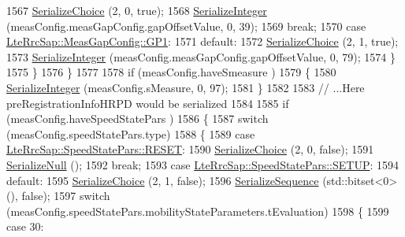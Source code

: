 \begin{DoxyCode}
1567               \hyperlink{classns3_1_1Asn1Header_a400ef4a710499da80fc55e23a973d4fa}{SerializeChoice} (2, 0, \textcolor{keyword}{true});
1568               \hyperlink{classns3_1_1Asn1Header_ab1c3bd37730affa7473bc759d625c29a}{SerializeInteger} (measConfig.measGapConfig.gapOffsetValue, 0, 39);
1569               \textcolor{keywordflow}{break};
1570             \textcolor{keywordflow}{case} \hyperlink{structns3_1_1LteRrcSap_1_1MeasGapConfig_a6e7b5e6cff6ff55fc54c397416804218aa24e9711cfb0bd2bcffca1630d6fe8b2}{LteRrcSap::MeasGapConfig::GP1}:
1571             \textcolor{keywordflow}{default}:
1572               \hyperlink{classns3_1_1Asn1Header_a400ef4a710499da80fc55e23a973d4fa}{SerializeChoice} (2, 1, \textcolor{keyword}{true});
1573               \hyperlink{classns3_1_1Asn1Header_ab1c3bd37730affa7473bc759d625c29a}{SerializeInteger} (measConfig.measGapConfig.gapOffsetValue, 0, 79);
1574             \}
1575         \}
1576     \}
1577 
1578   \textcolor{keywordflow}{if} (measConfig.haveSmeasure )
1579     \{
1580       \hyperlink{classns3_1_1Asn1Header_ab1c3bd37730affa7473bc759d625c29a}{SerializeInteger} (measConfig.sMeasure, 0, 97);
1581     \}
1582 
1583   \textcolor{comment}{// ...Here preRegistrationInfoHRPD would be serialized}
1584 
1585   \textcolor{keywordflow}{if} (measConfig.haveSpeedStatePars )
1586     \{
1587       \textcolor{keywordflow}{switch} (measConfig.speedStatePars.type)
1588         \{
1589         \textcolor{keywordflow}{case} \hyperlink{structns3_1_1LteRrcSap_1_1SpeedStatePars_a51570eeaecfaab1ca20bdb9df073d0a8aaca7f89f48db7f15fe477338c871fe3c}{LteRrcSap::SpeedStatePars::RESET}:
1590           \hyperlink{classns3_1_1Asn1Header_a400ef4a710499da80fc55e23a973d4fa}{SerializeChoice} (2, 0, \textcolor{keyword}{false});
1591           \hyperlink{classns3_1_1Asn1Header_ad1814fa357d2148457d7e4ade1ab84a8}{SerializeNull} ();
1592           \textcolor{keywordflow}{break};
1593         \textcolor{keywordflow}{case} \hyperlink{structns3_1_1LteRrcSap_1_1SpeedStatePars_a51570eeaecfaab1ca20bdb9df073d0a8a61ba32996ba78b9f21c25297709b8313}{LteRrcSap::SpeedStatePars::SETUP}:
1594         \textcolor{keywordflow}{default}:
1595           \hyperlink{classns3_1_1Asn1Header_a400ef4a710499da80fc55e23a973d4fa}{SerializeChoice} (2, 1, \textcolor{keyword}{false});
1596           \hyperlink{classns3_1_1Asn1Header_aa9744858380443ed95836fed08799aed}{SerializeSequence} (std::bitset<0> (), \textcolor{keyword}{false});
1597           \textcolor{keywordflow}{switch} (measConfig.speedStatePars.mobilityStateParameters.tEvaluation)
1598             \{
1599             \textcolor{keywordflow}{case} 30:

\end{DoxyCode}
